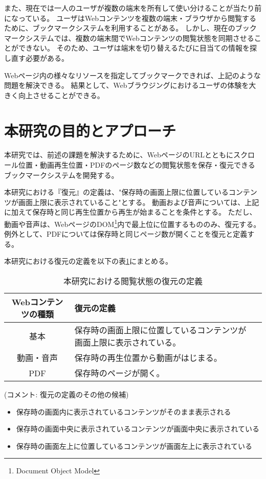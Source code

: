 また、現在では一人のユーザが複数の端末を所有して使い分けることが当たり前になっている。
ユーザはWebコンテンツを複数の端末・ブラウザから閲覧するために、ブックマークシステムを利用することがある。
しかし、現在のブックマークシステムでは、複数の端末間でWebコンテンツの閲覧状態を同期させることができない。
そのため、ユーザは端末を切り替えるたびに目当ての情報を探し直す必要がある。

Webページ内の様々なリソースを指定してブックマークできれば、上記のような問題を解決できる。
結果として、Webブラウジングにおけるユーザの体験を大きく向上させることができる。

\section{本研究の目的とアプローチ}
本研究では、前述の課題を解決するために、WebページのURLとともにスクロール位置・動画再生位置・PDFのページ数などの閲覧状態を保存・復元できるブックマークシステムを開発する。

本研究における『復元』の定義は、"保存時の画面上限に位置しているコンテンツが画面上限に表示されていること"とする。
動画および音声については、上記に加えて保存時と同じ再生位置から再生が始まることを条件とする。
ただし、動画や音声は、WebページのDOM\footnote{Document Object Model}内で最上位に位置するもののみ、復元する。
例外として、PDFについては保存時と同じページ数が開くことを復元と定義する。

本研究における復元の定義を以下の表\ref{tb:intro-restore-definition}にまとめる。

\begin{table}[htbp]
  \begin{center}
    \caption{本研究における閲覧状態の復元の定義}
    \label{tb:intro-restore-definition}
    \begin{tabular}{|c|l|l|}
      \hline
      Webコンテンツの種類 & 復元の定義 \\\hline\hline
      基本 & 保存時の画面上限に位置しているコンテンツが画面上限に表示されている。 \\\hline
      動画・音声 & 保存時の再生位置から動画がはじまる。 \\\hline
      PDF & 保存時のページが開く。 \\\hline
    \end{tabular}
  \end{center}
\end{table}

(コメント: 復元の定義のその他の候補)

\begin{itemize}
  \item 保存時の画面内に表示されているコンテンツがそのまま表示される
  \item 保存時の画面中央に表示されているコンテンツが画面中央に表示されている
  \item 保存時の画面左上に位置しているコンテンツが画面左上に表示されている
\end{itemize}

